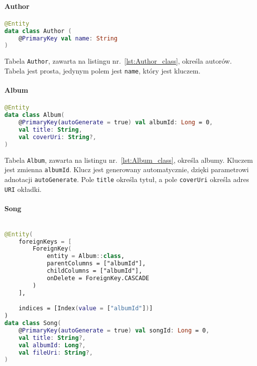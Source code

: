 \paragraph{Author}

\begin{lstlisting}[caption=Deklaracja tabeli Author, label={lst:Author_class}, language=kotlin]
@Entity
data class Author (
    @PrimaryKey val name: String
)
\end{lstlisting}

Tabela \texttt{Author}, zawarta na listingu nr.~\ref{lst:Author_class}, określa autorów. Tabela jest prosta, jedynym polem jest \texttt{name}, który jest kluczem.

\paragraph{Album}

\begin{lstlisting}[caption=Deklaracja tabeli Album, label={lst:Album_class}, language=kotlin]
@Entity
data class Album(
    @PrimaryKey(autoGenerate = true) val albumId: Long = 0,
    val title: String,
    val coverUri: String?,
)
\end{lstlisting}

Tabela \texttt{Album}, zawarta na listingu nr.~\ref{lst:Album_class}, określa albumy. Kluczem jest zmienna \texttt{albumId}. Klucz jest generowany automatycznie, dzięki parametrowi adnotacji \texttt{autoGenerate}. Pole \texttt{title} określa tytuł, a pole \texttt{coverUri} określa adres \texttt{URI} okładki.

\paragraph{Song}

\begin{lstlisting}[caption=Deklaracja tabeli Song, label={lst:Song_class}, language=kotlin]

@Entity(
    foreignKeys = [
        ForeignKey(
            entity = Album::class,
            parentColumns = ["albumId"],
            childColumns = ["albumId"],
            onDelete = ForeignKey.CASCADE
        )
    ],

    indices = [Index(value = ["albumId"])]
)
data class Song(
    @PrimaryKey(autoGenerate = true) val songId: Long = 0,
    val title: String?,
    val albumId: Long?,
    val fileUri: String?,
)

\end{lstlisting}

